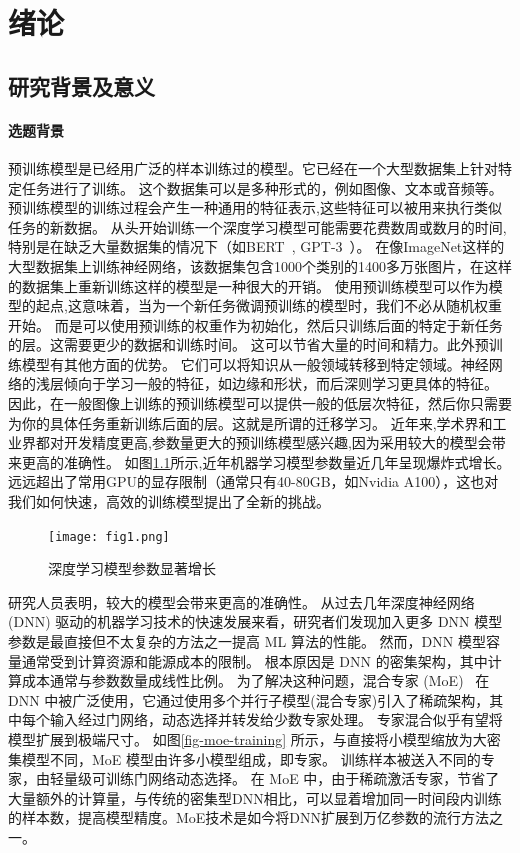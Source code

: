 \chapter{绪论}

\section{研究背景及意义}

\subsubsection{选题背景}

预训练模型是已经用广泛的样本训练过的模型。它已经在一个大型数据集上针对特定任务进行了训练。
% 
这个数据集可以是多种形式的，例如图像、文本或音频等。预训练模型的训练过程会产生一种通用的特征表示,这些特征可以被用来执行类似任务的新数据。
% 
从头开始训练一个深度学习模型可能需要花费数周或数月的时间,特别是在缺乏大量数据集的情况下（如BERT~, GPT-3~）。
% 
在像ImageNet这样的大型数据集上训练神经网络，该数据集包含1000个类别的1400多万张图片，在这样的数据集上重新训练这样的模型是一种很大的开销。
% 
使用预训练模型可以作为模型的起点,这意味着，当为一个新任务微调预训练的模型时，我们不必从随机权重开始。
% 
而是可以使用预训练的权重作为初始化，然后只训练后面的特定于新任务的层。这需要更少的数据和训练时间。
% 
这可以节省大量的时间和精力。此外预训练模型有其他方面的优势。
% 
它们可以将知识从一般领域转移到特定领域。神经网络的浅层倾向于学习一般的特征，如边缘和形状，而后深则学习更具体的特征。
% 
因此，在一般图像上训练的预训练模型可以提供一般的低层次特征，然后你只需要为你的具体任务重新训练后面的层。这就是所谓的迁移学习。
% 
近年来,学术界和工业界都对开发精度更高,参数量更大的预训练模型感兴趣,因为采用较大的模型会带来更高的准确性。
% 
如图\ref{fig-dl}所示,近年机器学习模型参数量近几年呈现爆炸式增长。远远超出了常用GPU的显存限制（通常只有40-80GB，如Nvidia A100），这也对我们如何快速，高效的训练模型提出了全新的挑战。

\begin{figure}[t]
\centering
\texttt{[image: fig1.png]}
\caption{深度学习模型参数显著增长}
\label{fig-dl}
\end{figure}


研究人员表明，较大的模型会带来更高的准确性。
% 
从过去几年深度神经网络 (DNN) 驱动的机器学习技术的快速发展来看，研究者们发现加入更多 DNN 模型参数是最直接但不太复杂的方法之一提高 ML 算法的性能。
% 
然而，DNN 模型容量通常受到计算资源和能源成本的限制。
% 
根本原因是 DNN 的密集架构，其中计算成本通常与参数数量成线性比例。
% 
为了解决这种问题，混合专家 (MoE)~ 在 DNN 中被广泛使用，它通过使用多个并行子模型(混合专家)引入了稀疏架构，其中每个输入经过门网络，动态选择并转发给少数专家处理。
% 
专家混合似乎有望将模型扩展到极端尺寸。
% 
如图\ref{fig-moe-training} 所示，与直接将小模型缩放为大密集模型不同，MoE 模型由许多小模型组成，即专家。
% 
训练样本被送入不同的专家，由轻量级可训练门网络动态选择。
% 
在 MoE 中，由于稀疏激活专家，节省了大量额外的计算量，与传统的密集型DNN相比，可以显着增加同一时间段内训练的样本数，提高模型精度。MoE技术是如今将DNN扩展到万亿参数的流行方法之一。

